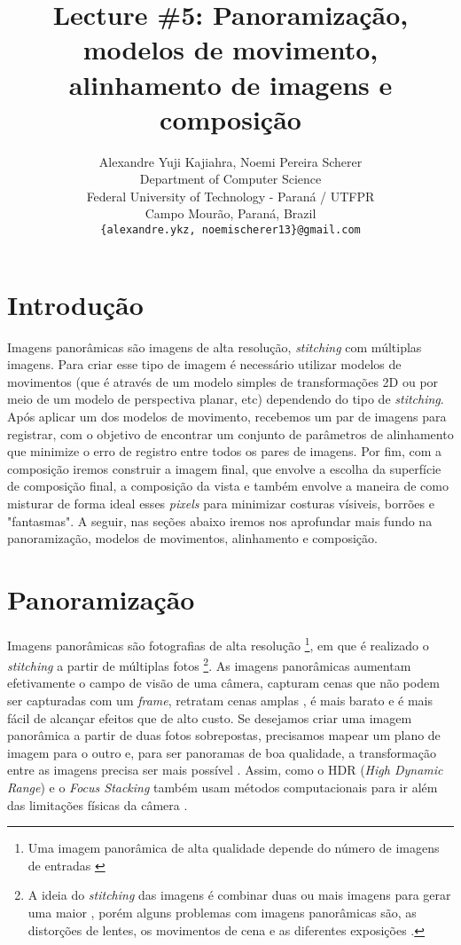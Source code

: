 \documentclass{article}
\title{Lecture \#5: Panoramização, modelos de movimento, alinhamento de imagens e composição}
\author{
	Alexandre Yuji Kajiahra, Noemi Pereira Scherer \\
	Department of Computer Science\\
	Federal University of Technology - Paran\'{a} / UTFPR\\
	Campo Mour\~{a}o, Paran\'{a}, Brazil \\
	\texttt{\{{alexandre.ykz, noemischerer13\}}@gmail.com}
}
\begin{document}
\maketitle

\section{Introdução}

Imagens panorâmicas são imagens de alta resolução, \textit{stitching} com múltiplas imagens. Para criar esse tipo de imagem é necessário utilizar modelos de movimentos (que é através de um modelo simples de transformações 2D ou por meio de um modelo de perspectiva planar, etc) dependendo do tipo de \textit{stitching}. Após aplicar um dos modelos de movimento, recebemos um par de imagens para registrar, com o objetivo de encontrar um conjunto de parâmetros de alinhamento que minimize o erro de registro entre todos os pares de imagens. Por fim, com a composição iremos construir a imagem final, que envolve a escolha da superfície de composição final, a composição da vista e também envolve a maneira de como misturar de forma ideal esses \textit{pixels} para minimizar costuras vísiveis, borrões e "fantasmas". A seguir, nas seções abaixo iremos nos aprofundar mais fundo na panoramização, modelos de movimentos, alinhamento e composição.

\section{Panoramização}
Imagens panorâmicas são fotografias de alta resolução \footnote{Uma imagem panorâmica de alta qualidade depende do número de imagens de entradas \cite{chauandkarol:2015}}, em que é realizado o \textit{stitching} a partir de múltiplas fotos \footnote{A ideia do \textit{stitching} das imagens é combinar duas ou mais imagens para gerar uma maior \cite{hoeim:2010}, porém alguns problemas com imagens panorâmicas são, as distorções de lentes, os movimentos de cena e as diferentes exposições \cite{morse:2012}.}. As imagens panorâmicas aumentam efetivamente o campo de visão de uma câmera\cite{juanandgwun:2010}, capturam cenas que não podem ser capturadas com um \textit{frame}, retratam cenas amplas \cite{xiao:2014}, é mais barato e é mais fácil de alcançar efeitos que de alto custo. Se desejamos criar uma imagem panorâmica a partir de duas fotos sobrepostas, precisamos mapear um plano de imagem para o outro e, para ser panoramas de boa qualidade, a transformação entre as imagens precisa ser mais possível \cite{xiao:2014}. Assim, como o HDR (\textit{High Dynamic Range}) e o \textit{Focus Stacking} também usam métodos computacionais para ir além das limitações físicas da câmera \cite{hoeim:2010}. 
\end{document}
